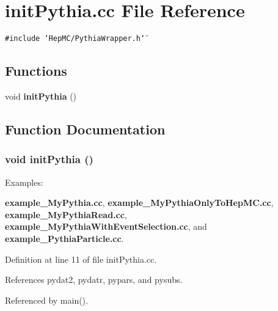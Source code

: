 \section{init\-Pythia.cc File Reference}
\label{initPythia_8cc}
{\tt \#include \char`\"{}Hep\-MC/Pythia\-Wrapper.h\char`\"{}}\par
\subsection*{Functions}
\begin{CompactItemize}
\item 
void {\bf init\-Pythia} ()
\end{CompactItemize}


\subsection{Function Documentation}
\subsubsection{\setlength{\rightskip}{0pt plus 5cm}void init\-Pythia ()}\label{initPythia_8cc_ad69b06fecb6fbe240681e20c675e687}


\begin{Desc}
\item[Examples: ]\par
{\bf example\_\-My\-Pythia.cc}, {\bf example\_\-My\-Pythia\-Only\-To\-Hep\-MC.cc}, {\bf example\_\-My\-Pythia\-Read.cc}, {\bf example\_\-My\-Pythia\-With\-Event\-Selection.cc}, and {\bf example\_\-Pythia\-Particle.cc}.\end{Desc}


Definition at line 11 of file init\-Pythia.cc.

References pydat2, pydatr, pypars, and pysubs.

Referenced by main().